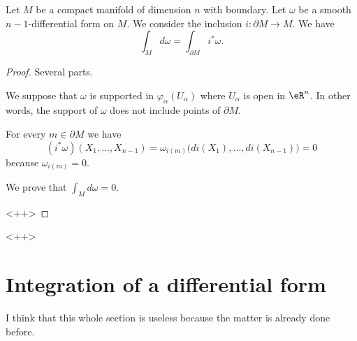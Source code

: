 \begin{theorem}	\label{THOooFTNKooQzBPIN}
	Let \( M\) be a compact manifold of dimension \( n\) with boundary. Let \( \omega\) be a smooth \( n-1\)-differential form on \( M\). We consider the inclusion \(i \colon \partial M\to M  \). We have
	\begin{equation}
		\int_Md\omega=\int_{\partial M} i^*\omega.
	\end{equation}
\end{theorem}

\begin{proof}
	Several parts.
	\begin{subproof}
		We suppose that \( \omega\) is supported in \( \varphi_{\alpha}(U_{\alpha})\) where \( U_{\alpha}\) is open in \( \eR^n\). In other words, the support of \( \omega\) does not include points of \( \partial M\).
		\begin{subproof}
			\spitem[\( i^*\omega=0\)]
			For every \( m\in \partial M\) we have
			\begin{equation}
				(i^*\omega)(X_1,\ldots,X_{n-1})=\omega_{i(m)}\big( di(X_1),\ldots,di(X_{n-1}) \big)=0
			\end{equation}
			because \( \omega_{i(m)}=0\).

			\spitem[\( \int_Md\omega=0\)]
			We prove that \( \int_Md\omega=0\).
		\end{subproof}
	\end{subproof}<++>
\end{proof}<++>

\section{Integration of a differential form}

I think that this whole section is useless because the matter is already done before.

